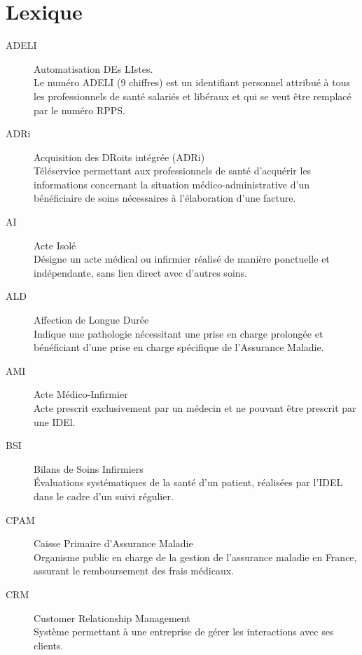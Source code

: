 \documentclass{article}
\begin{document}
\newpage

\section{Lexique}

\begin{description}
    \item[ADELI\label{term:ADELI}] Automatisation DEs LIstes. \\
    Le numéro ADELI (9 chiffres) est un identifiant personnel attribué à tous les professionnels de santé salariés et libéraux et qui se veut être remplacé par le numéro RPPS.

    \item[ADRi\label{term:adri}] Acquisition des DRoits intégrée (ADRi) \\
    Téléservice permettant aux professionnels de santé d'acquérir les informations concernant la situation médico-administrative d'un bénéficiaire de soins nécessaires à l'élaboration d'une facture.

    \item[AI\label{term:ai}] Acte Isolé \\
    Désigne un acte médical ou infirmier réalisé de manière ponctuelle et indépendante, sans lien direct avec d'autres soins.

    \item[ALD\label{term:ald}] Affection de Longue Durée \\
    Indique une pathologie nécessitant une prise en charge prolongée et bénéficiant d'une prise en charge spécifique de l'Assurance Maladie.

    \item[AMI\label{term:ami}] Acte Médico-Infirmier \\
    Acte prescrit exclusivement par un médecin et ne pouvant être prescrit par une IDEl.

    \item[BSI\label{term:bsi}] Bilans de Soins Infirmiers \\
    Évaluations systématiques de la santé d'un patient, réalisées par l'IDEL dans le cadre d'un suivi régulier.

    \item[CPAM\label{term:cpam}] Caisse Primaire d'Assurance Maladie \\
    Organisme public en charge de la gestion de l'assurance maladie en France, assurant le remboursement des frais médicaux.

    \item[CRM\label{term:crm}] Customer Relationship Management \\
    Système permettant à une entreprise de gérer les interactions avec ses clients.


\end{description}
\end{document}
